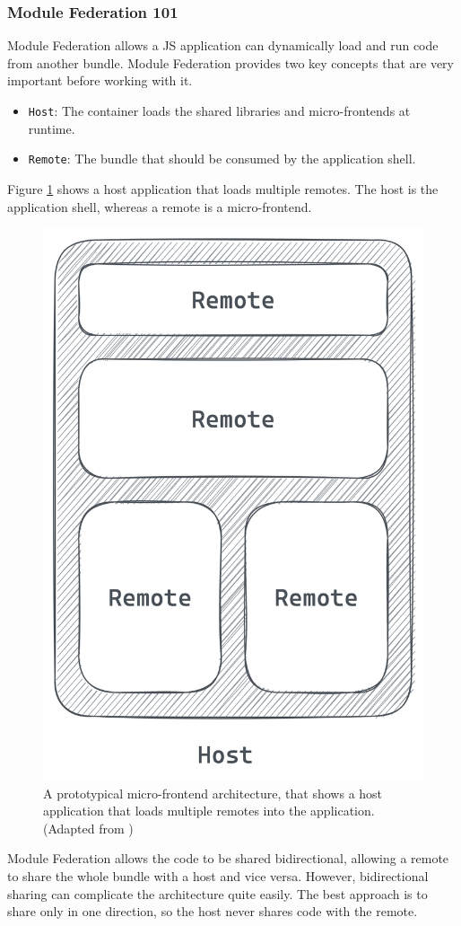 \subsubsection{Module Federation 101}\label{subsubsection:background:micro-frontend:module-federation:101}

Module Federation allows a \ac{JS} application can dynamically load and run code from another bundle. Module Federation provides two key concepts that are very important before working with it. \cite[118-119]{book:2021:mezzalira:applied-methods:building-micro-frontends}

\begin{itemize}
    \item \texttt{Host}: The container loads the shared libraries and micro-frontends at runtime.
    \item \texttt{Remote}: The bundle that should be consumed by the application shell.
\end{itemize}

\noindent Figure \ref{fig:background:micro-frontend:module-federation:module-federation-architecture} shows a host application that loads multiple remotes. The host is the application shell, whereas a remote is a micro-frontend.

\ifshowImages
\begin{figure}[H]
    \centering
    \includegraphics[width=0.3\linewidth]{images/background/micro-frontends/module-federation/module-federation-architecture.png}
    \caption{A prototypical micro-frontend architecture, that shows a host application that loads multiple remotes into the application. (Adapted from \cite[119]{book:2021:mezzalira:applied-methods:building-micro-frontends})
    }\label{fig:background:micro-frontend:module-federation:module-federation-architecture}
\end{figure}
\fi

\noindent Module Federation allows the code to be shared bidirectional, allowing a remote to share the whole bundle with a host and vice versa. However, bidirectional sharing can complicate the architecture quite easily. The best approach is to share only in one direction, so the host never shares code with the remote. \cite[119]{book:2021:mezzalira:applied-methods:building-micro-frontends}

